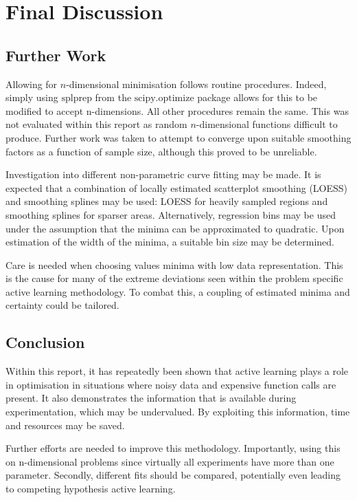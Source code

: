 \chapter{Final Discussion}

\ifpdf
    \graphicspath{{Chapter3/Figs/Raster/}{Chapter3/Figs/PDF/}{Chapter3/Figs/}}
\else
    \graphicspath{{Chapter3/Figs/Vector/}{Chapter3/Figs/}}
\fi

\section{Further Work}
Allowing for $n$-dimensional minimisation follows routine procedures. Indeed, simply using $\text{splprep}$ from the $\text{scipy.optimize}$ package allows for this to be modified to accept n-dimensions. All other procedures remain the same. This was not evaluated within this report as random $n$-dimensional functions difficult to produce. Further work was taken to attempt to converge upon suitable smoothing factors as a function of sample size, although this proved to be unreliable.

Investigation into different non-parametric curve fitting may be made. It is expected that a combination of locally estimated scatterplot smoothing (LOESS) and smoothing splines may be used: LOESS for heavily sampled regions and smoothing splines for sparser areas. Alternatively, regression bins may be used under the assumption that the minima can be approximated to quadratic. Upon estimation of the width of the minima, a suitable bin size may be determined.

Care is needed when choosing values minima with low data representation. This is the cause for many of the extreme deviations seen within the problem specific active learning methodology. To combat this, a coupling of estimated minima and certainty could be tailored. 

\section{Conclusion}
Within this report, it has repeatedly been shown that active learning plays a role in optimisation in situations where noisy data and expensive function calls are present. It also demonstrates the information that is available during experimentation, which may be undervalued. By exploiting this information, time and resources may be saved.

Further efforts are needed to improve this methodology. Importantly, using this on n-dimensional problems since virtually all experiments have more than one parameter. Secondly, different fits should be compared, potentially even leading to competing hypothesis active learning.